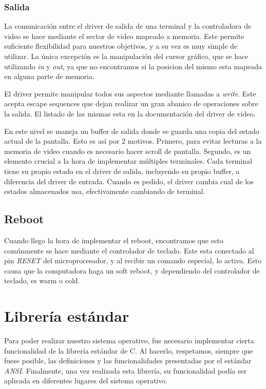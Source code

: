 \documentclass[a4paper,10pt]{article}
\begin{document}
        \subsubsection{Salida}
            La comunicación entre el driver de salida de una terminal y la controladora de video se hace mediante el sector de video mapeado a memoria.
            Este permite suficiente flexibilidad para nuestros objetivos, y a su vez es muy simple de utilizar.
            La única excepción es la manipulación del cursor gráfico, que se hace utilizando \textit{in} y \textit{out}, ya que no encontramos si la posicion del mismo esta mapeada en alguna parte de memoria.

            El driver permite manipular todos sus aspectos mediante llamadas a \textit{write}.
            Este acepta escape sequences que dejan realizar un gran abanico de operaciones sobre la salida.
            El listado de las mismas esta en la documentación del driver de video.
            
            En este nivel se maneja un buffer de salida donde se guarda una copia del estado actual de la pantalla.
            Esto es así por 2 motivos.
            Primero, para evitar lecturas a la memoria de video cuando es necesario hacer scroll de pantalla.
            Segundo, es un elemento crucial a la hora de implementar múltiples terminales.
            Cada terminal tiene su propio estado en el driver de salida, incluyendo su propio buffer, a diferencia del driver de entrada.
            Cuando es pedido, el driver cambia cual de los estados almacenados usa, efectivamente cambiando de terminal.

    \subsection{Reboot} 
        Cuando llego la hora de implementar el reboot, encontramos que esto comúnmente se hace mediante el controlador de teclado.
        Este esta conectado al pin \textit{RESET} del microprocesador, y al recibir un comando especial, lo activa.
        Esto causa que la computadora haga un soft reboot, y dependiendo del controlador de teclado, es warm o cold.

\section{Librería estándar}
    Para poder realizar nuestro sistema operativo, fue necesario implementar cierta funcionalidad de la librería estándar de C. Al hacerlo, respetamos, siempre que fuese posible, las definiciones y las funcionalidades presentadas por el estándar \textit{ANSI}.
    Finalmente, una vez realizada esta librería, su funcionalidad podía ser aplicada en diferentes lugares del sistema operativo.
\end{document}
